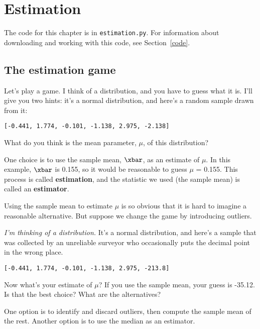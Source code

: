 \documentclass[12pt]{book}
\begin{document}
\chapter{Estimation}
\label{estimation}

The code for this chapter is in {\tt estimation.py}.  For information
about downloading and working with this code, see Section~\ref{code}.


\section{The estimation game}

Let's play a game.  I think of a distribution, and you have to guess
what it is.  I'll give you two hints: it's a
normal distribution, and here's a random sample drawn from it:

{\tt [-0.441, 1.774, -0.101, -1.138, 2.975, -2.138]}

What do you think is the mean parameter, $\mu$, of this distribution?

One choice is to use the sample mean, $\xbar$, as an estimate of $\mu$.
In this example, $\xbar$ is 0.155, so it would
be reasonable to guess $\mu$ = 0.155.
This process is called {\bf estimation}, and the statistic we used
(the sample mean) is called an {\bf estimator}.

Using the sample mean to estimate $\mu$ is so obvious that it is hard
to imagine a reasonable alternative.  But suppose we change the game by
introducing outliers.

{\em I'm thinking of a distribution.}  It's a normal distribution, and
here's a sample that was collected by an unreliable surveyor who
occasionally puts the decimal point in the wrong place.

{\tt [-0.441, 1.774, -0.101, -1.138, 2.975, -213.8]}

Now what's your estimate of $\mu$?  If you use the sample mean, your
guess is -35.12.  Is that the best choice?  What are the alternatives?

One option is to identify and discard outliers, then compute the sample
mean of the rest.  Another option is to use the median as an estimator.
\end{document}

